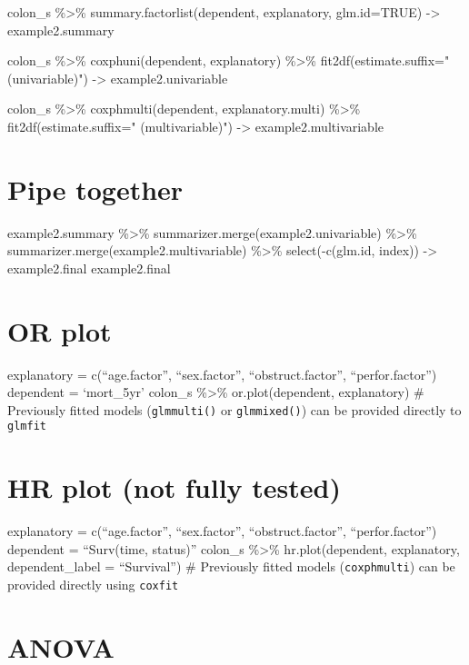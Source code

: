 \documentclass[]{article}
\begin{document}
colon\_s \%\textgreater\% summary.factorlist(dependent, explanatory,
glm.id=TRUE) -\textgreater{} example2.summary

colon\_s \%\textgreater\% coxphuni(dependent, explanatory)
\%\textgreater\% fit2df(estimate.suffix=" (univariable)")
-\textgreater{} example2.univariable

colon\_s \%\textgreater\% coxphmulti(dependent, explanatory.multi)
\%\textgreater\% fit2df(estimate.suffix=" (multivariable)")
-\textgreater{} example2.multivariable

\hypertarget{pipe-together-1}{%
\section{Pipe together}\label{pipe-together-1}}

example2.summary \%\textgreater\% summarizer.merge(example2.univariable)
\%\textgreater\% summarizer.merge(example2.multivariable)
\%\textgreater\% select(-c(glm.id, index)) -\textgreater{}
example2.final example2.final

\hypertarget{or-plot}{%
\section{OR plot}\label{or-plot}}

explanatory = c(``age.factor'', ``sex.factor'', ``obstruct.factor'',
``perfor.factor'') dependent = `mort\_5yr' colon\_s \%\textgreater\%
or.plot(dependent, explanatory) \# Previously fitted models
(\texttt{glmmulti()} or \texttt{glmmixed()}) can be provided directly to
\texttt{glmfit}

\hypertarget{hr-plot-not-fully-tested}{%
\section{HR plot (not fully tested)}\label{hr-plot-not-fully-tested}}

explanatory = c(``age.factor'', ``sex.factor'', ``obstruct.factor'',
``perfor.factor'') dependent = ``Surv(time, status)'' colon\_s
\%\textgreater\% hr.plot(dependent, explanatory, dependent\_label =
``Survival'') \# Previously fitted models (\texttt{coxphmulti}) can be
provided directly using \texttt{coxfit}

\hypertarget{anova}{%
\section{ANOVA}\label{anova}}
\end{document}
